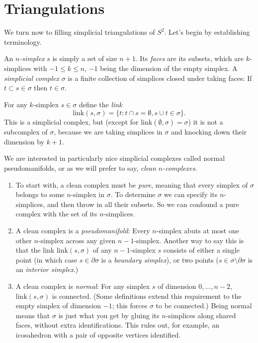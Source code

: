 \documentclass[12pt]{article}
\def\del{\partial}
\newcommand{\kw}{\mathrm}
\newcommand{\link}{\kw{link}}
\begin{document}
\section{Triangulations}

We turn now to filling simplicial triangulations of $S^2$.
Let's begin by establishing terminology.

An \emph{$n$-simplex} $s$ is simply a set of size $n+1$.
Its \emph{faces} are its subsets,
which are $k$-simplices with $-1 \leq k \leq n$,
$-1$ being the dimension of the empty simplex.
A \emph{simplicial complex} $\sigma$ is a finite collection of simplices
closed under taking faces:
If $t \subset s \in \sigma$ then $t \in \sigma$.

For any $k$-simplex $s \in \sigma$ define the \emph{link}
\[
\link(s,\sigma) = \{t: t \cap s = \emptyset, s \cup t \in \sigma \}
.
\]
This is a simplicial complex, but
(except for $\link(\emptyset,\sigma)=\sigma$)
it is not a subcomplex of $\sigma$,
because we are taking simplices in $\sigma$ and knocking down
their dimension by $k+1$.

We are interested in particularly nice simplicial complexes
called normal pseudomanifolds, or as we will prefer to say,
\emph{clean $n$-complexes}.

\begin{enumerate}
\item
To start with,
a clean complex must be \emph{pure},
meaning that every simplex of $\sigma$ belongs to some $n$-simplex in $\sigma$.
To determine $\sigma$ we can specify its $n$-simplices,
and then throw in all their subsets.
So we can confound a pure complex with the set of its $n$-simplices.

\item
A clean complex is a \emph{pseudomanifold}:
Every $n$-simplex abuts at most one other $n$-simplex
across any given $n-1$-simplex.
Another way to say this is that
the link $\link(s,\sigma)$ of any $n-1$-simplex $s$
consists of either a single point 
(in which case $s \in \del \sigma$ is a \emph{boundary simplex}),
or two points
($s \in \sigma \setminus \del \sigma$ is an \emph{interior simplex}.)

\item
A clean complex is \emph{normal}:
For any simplex $s$ of dimension $0,\ldots,n-2$,
$\link(s,\sigma)$ is connected.
(Some definitions extend this requirement
to the empty simplex of dimension $-1$;
this forces $\sigma$ to be connected.)
Being normal means that $\sigma$ is just what you get by gluing its 
$n$-simplices along shared faces,
without extra identifications. This rules out, for example,
an icosahedron with a pair of opposite vertices identified.
\end{enumerate}
\end{document}
